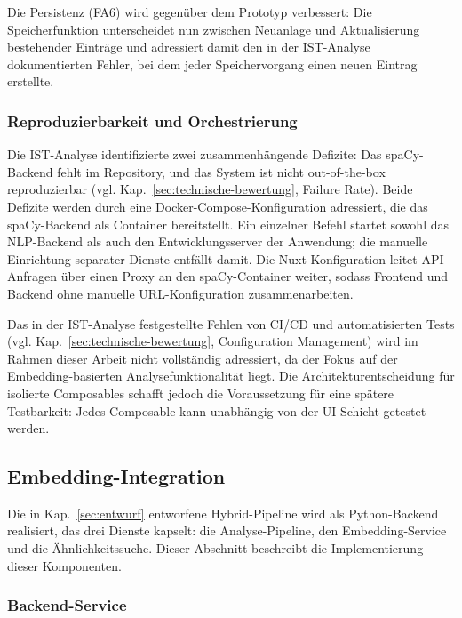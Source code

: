 Die Persistenz (FA6) wird gegenüber dem Prototyp verbessert: Die Speicherfunktion unterscheidet nun zwischen Neuanlage und Aktualisierung bestehender Einträge und adressiert damit den in der IST-Analyse dokumentierten Fehler, bei dem jeder Speichervorgang einen neuen Eintrag erstellte.

\subsubsection{Reproduzierbarkeit und Orchestrierung}\label{sec:orchestrierung}

Die IST-Analyse identifizierte zwei zusammenhängende Defizite: Das spaCy-Backend fehlt im Repository, und das System ist nicht out-of-the-box reproduzierbar (vgl. Kap.~\ref{sec:technische-bewertung}, Failure Rate).
Beide Defizite werden durch eine Docker-Compose-Konfiguration adressiert, die das spaCy-Backend als Container bereitstellt.
Ein einzelner Befehl startet sowohl das NLP-Backend als auch den Entwicklungsserver der Anwendung; die manuelle Einrichtung separater Dienste entfällt damit.
Die Nuxt-Konfiguration leitet API-Anfragen über einen Proxy an den spaCy-Container weiter, sodass Frontend und Backend ohne manuelle URL-Konfiguration zusammenarbeiten.

Das in der IST-Analyse festgestellte Fehlen von CI/CD und automatisierten Tests (vgl. Kap.~\ref{sec:technische-bewertung}, Configuration Management) wird im Rahmen dieser Arbeit nicht vollständig adressiert, da der Fokus auf der Embedding-basierten Analysefunktionalität liegt.
Die Architekturentscheidung für isolierte Composables schafft jedoch die Voraussetzung für eine spätere Testbarkeit: Jedes Composable kann unabhängig von der UI-Schicht getestet werden.

\subsection{Embedding-Integration}\label{sec:impl-embedding}

Die in Kap.~\ref{sec:entwurf} entworfene Hybrid-Pipeline wird als Python-Backend realisiert, das drei Dienste kapselt: die Analyse-Pipeline, den Embedding-Service und die Ähnlichkeitssuche.
Dieser Abschnitt beschreibt die Implementierung dieser Komponenten.

\subsubsection{Backend-Service}\label{sec:backend-service}

